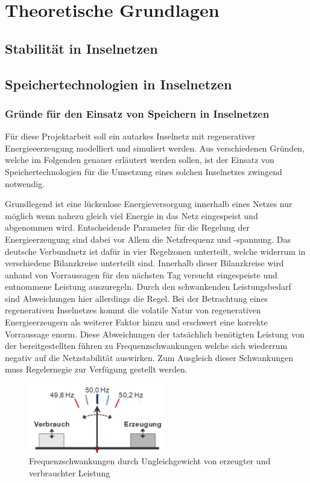 \chapter{Theoretische Grundlagen}

\section{Stabilität in Inselnetzen}

\section{Speichertechnologien in Inselnetzen}

\subsection{Gründe für den Einsatz von Speichern in Inselnetzen}
Für diese Projektarbeit soll ein autarkes Inselnetz mit regenerativer Energieeerzeugung 
modelliert und simuliert werden.
Aus verschiedenen Gründen, welche im Folgenden genauer erläutert werden sollen, ist der Einsatz von
Speichertechnologien für die Umsetzung eines solchen Inselnetzes zwingend notwendig.

Grundlegend ist eine lückenlose Energieversorgung innerhalb eines Netzes nur möglich wenn nahezu gleich viel Energie in das Netz
eingespeist und abgenommen wird.
Entscheidende Parameter für die Regelung der Energieerzeugung sind dabei vor Allem die Netzfrequenz 
und -spannung.
Das deutsche Verbundnetz ist dafür in vier Regelzonen unterteilt, welche widerrum in verschiedene
Bilanzkreise unterteilt sind.
Innerhalb dieser Bilanzkreise wird anhand von Vorraussagen für den nächsten Tag versucht
eingespeiste und entnommene Leistung auszuregeln.
Durch den schwankenden Leistungsbedarf sind Abweichungen hier allerdings die Regel.
Bei der Betrachtung eines regenerativen Inselnetzes kommt die volatile Natur von regenerativen Energieerzeugern
als weiterer Faktor hinzu und erschwert eine korrekte Vorraussage enorm.
Diese Abweichungen der tatsächlich benötigten Leistung von der bereitgestellten führen zu Frequenzschwankungen
welche sich wiederrum negativ auf die Netzstabilität auswirken.
Zum Ausgleich dieser Schwankungen muss Regelernegie zur Verfügung gestellt werden.

\begin{figure}[h!]
    \centering
    \includegraphics[width=6cm]{Abbildungen/Sollfrequenz.png}
    \caption{Frequenzschwankungen durch Ungleichgewicht von erzeugter und verbrauchter Leistung~\parencite{cronenberg_beschreibung_nodate}}\label{Gleichgewicht}
\end{figure}

